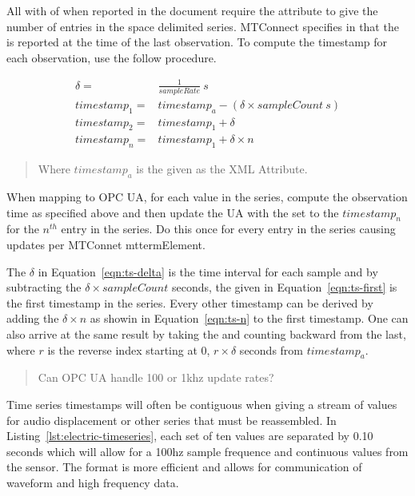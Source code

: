 All  with  of  when reported in the  document require the attribute  to give the number of entries in the space delimited series. MTConnect specifies in \cite{MTCPart3} that the  is reported at the time of the last observation. To compute the timestamp for each observation, use the follow procedure.

\begin{align}
  \delta =& \frac{1}{sampleRate}\ s \label{eqn:ts-delta} \\
  timestamp_1 =& timestamp_a - (\delta \times sampleCount\ s) \label{eqn:ts-first} \\
  timestamp_2 =& timestamp_1 + \delta  \label{eqn:ts-second} \\
  timestamp_n =& timestamp_1 + \delta \times n \label{eqn:ts-n}
\end{align}
\begin{quote}
  Where $timestamp_a$ is the  given as the XML Attribute.
\end{quote}

When mapping  to OPC UA, for each value in the series, compute the observation time as specified above and then update the UA  with the  set to the $timestamp_n$ for the $n^{th}$ entry in the series. Do this once for every entry in the series causing  updates per MTConnet  mtterm{Element}.

The $\delta$ in Equation~\ref{eqn:ts-delta} is the time interval for each sample and by subtracting the $\delta \times sampleCount$ seconds, the given in Equation~\ref{eqn:ts-first} is the first timestamp in the series. Every other timestamp can be derived by adding the $\delta \times n$ as showin in Equation~\ref{eqn:ts-n} to the first timestamp. One can also arrive at the same result by taking the  and counting backward from the last, where $r$ is the reverse index starting at 0, $r \times \delta$ seconds from $timestamp_a$.

\begin{quote}
  \color{red} Can OPC UA handle 100 or 1khz update rates?
\end{quote}

Time series timestamps will often be contiguous when giving a stream of values for audio displacement or other series that must be reassembled. In Listing~\ref{lst:electric-timeseries}, each set of ten values are separated by 0.10 seconds which will allow for a 100hz sample frequence and continuous values from the sensor. The format is more efficient and allows for communication of waveform and high frequency data.

